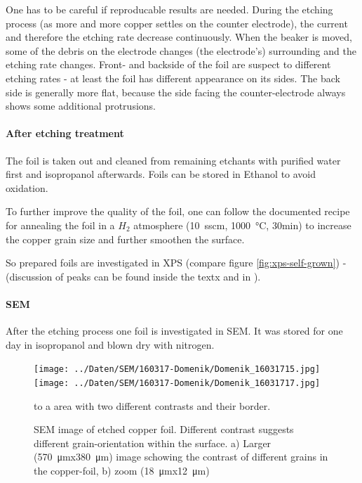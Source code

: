 One has to be careful if reproducable results are needed. During the etching process (as more and more copper settles on the counter electrode), the current and therefore the etching rate decrease continuously. When the beaker is moved, some of the debris on the electrode changes (the electrode's) surrounding and the etching rate changes. Front- and backside of the foil are suspect to different etching rates - at least the foil has different appearance on its sides. The back side is generally more flat, because the side facing the counter-electrode always shows some additional protrusions.

\paragraph{After etching treatment}
The foil is taken out and cleaned from remaining etchants with purified water first and isopropanol afterwards. Foils can be stored in Ethanol to avoid oxidation. 

To further improve the quality of the foil, one can follow the documented recipe for annealing the foil in a $H_2$ atmosphere (\SI{10}{sscm}, \SI{1000}{\celsius}, 30min)\cite{kim_synthesis_2012} to increase the copper grain size and further smoothen the surface. 

So prepared foils are investigated in XPS (compare figure \ref{fig:xps-self-grown}) - (discussion of peaks can be found inside the textx and in \cite[8]{stables_report_2008}).

\paragraph{SEM}
After the etching process one foil is investigated in SEM. It was stored for one day in isopropanol and blown dry with nitrogen. 

\begin{figure}[h]
  \begin{center}
   \texttt{[image: ../Daten/SEM/160317-Domenik/Domenik\_16031715.jpg]}
   \texttt{[image: ../Daten/SEM/160317-Domenik/Domenik\_16031717.jpg]}
  \end{center}
 \caption{SEM image of etched copper foil. Different contrast suggests different grain-orientation within the surface. a) Larger (\SI{570}{\micro \meter}x\SI{380}{\micro \meter}) image schowing the contrast of different grains in the copper-foil, b) zoom (\SI{18}{\micro \meter}x\SI{12}{\micro \meter})} to a area with two different contrasts and their border.
 \label{SEM-gb}
\end{figure}

